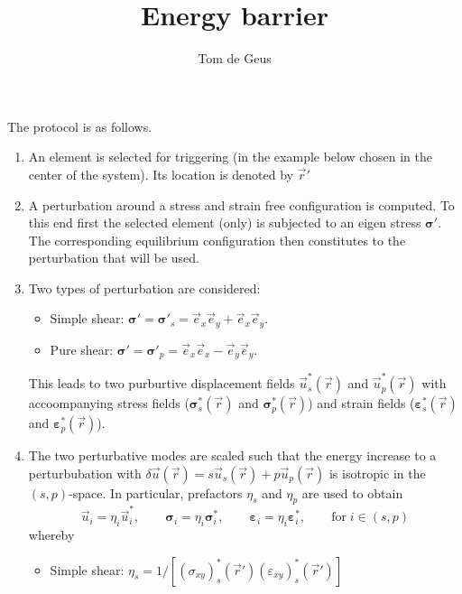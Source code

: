 \documentclass{goose-article}
\title{Energy barrier}
\author{Tom de Geus}
\begin{document}
\maketitle

The protocol is as follows.
\begin{enumerate}
    \item An element is selected for triggering
    (in the example below chosen in the center of the system).
    Its location is denoted by $\vec{r}'$

    \item A perturbation around a stress and strain free configuration is computed.
    To this end first the selected element (only) is subjected to an eigen stress
    $\bm{\sigma}'$.
    The corresponding equilibrium configuration then constitutes to
    the perturbation that will be used.

    \item Two types of perturbation are considered:
    \begin{itemize}
        \item Simple shear:
        $\bm{\sigma}' = \bm{\sigma}'_s = \vec{e}_x \vec{e}_y + \vec{e}_x \vec{e}_y$.

        \item Pure shear:
        $\bm{\sigma}' = \bm{\sigma}'_p = \vec{e}_x \vec{e}_x - \vec{e}_y \vec{e}_y$.
    \end{itemize}

    This leads to two purburtive displacement fields
    $\vec{u}^*_s (\vec{r})$ and $\vec{u}^*_p (\vec{r})$
    with accoompanying stress fields ($\bm{\sigma}^*_s (\vec{r})$ and $\bm{\sigma}^*_p (\vec{r})$)
    and strain fields ($\bm{\varepsilon}^*_s (\vec{r})$ and $\bm{\varepsilon}^*_p (\vec{r})$).

    \item The two perturbative modes are scaled such that the energy increase to a perturbubation
    with $\delta \vec{u}(\vec{r}) = s \vec{u}_s (\vec{r}) + p \vec{u}_p (\vec{r})$ is isotropic in
    the $(s, p)$-space.
    In particular, prefactors $\eta_s$ and $\eta_p$ are used to obtain
    \begin{equation}
        \vec{u}_i = \eta_i \vec{u}^*_i, \qquad
        \bm{\sigma}_i = \eta_i \bm{\sigma}^*_i, \qquad
        \bm{\varepsilon}_i = \eta_i \bm{\varepsilon}^*_i, \qquad
        \text{for}\; i \in (s, p)
    \end{equation}
    whereby
    \begin{itemize}
        \item Simple shear:
        $\eta_s = 1 / [(\sigma_{xy})^*_s (\vec{r}') (\varepsilon_{xy})^*_s (\vec{r}')]$


\end{itemize}
\end{enumerate}
\end{document}
